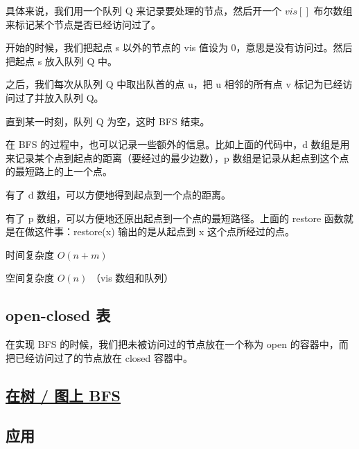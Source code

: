 具体来说，我们用一个队列 Q 来记录要处理的节点，然后开一个 $vis[]$ 布尔数组来标记某个节点是否已经访问过了。

开始的时候，我们把起点 s 以外的节点的 vis 值设为 0，意思是没有访问过。然后把起点 s 放入队列 Q 中。

之后，我们每次从队列 Q 中取出队首的点 u，把 u 相邻的所有点 v 标记为已经访问过了并放入队列 Q。

直到某一时刻，队列 Q 为空，这时 BFS 结束。

在 BFS 的过程中，也可以记录一些额外的信息。比如上面的代码中，d 数组是用来记录某个点到起点的距离（要经过的最少边数），p 数组是记录从起点到这个点的最短路上的上一个点。

有了 d 数组，可以方便地得到起点到一个点的距离。

有了 p 数组，可以方便地还原出起点到一个点的最短路径。上面的 restore 函数就是在做这件事：restore(x) 输出的是从起点到 x 这个点所经过的点。

时间复杂度 $O(n + m)$

空间复杂度 $O(n)$ （vis 数组和队列）

\subsection{open-closed 表}

在实现 BFS 的时候，我们把未被访问过的节点放在一个称为 open 的容器中，而把已经访问过了的节点放在 closed 容器中。

\subsection{\href{/graph/traverse}{在树 / 图上 BFS}}

\subsection{应用}


